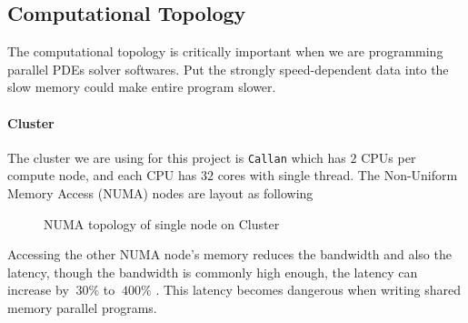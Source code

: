 \subsection{Computational Topology}
The computational topology is critically important when we are programming parallel PDEs solver softwares.
Put the strongly speed-dependent data into the slow memory could make entire program slower.

\paragraph{Cluster}
The cluster we are using for this project is \texttt{Callan} \cite{Callan_TCD} which has 
$2$ CPUs per compute node, and each CPU has $32$ cores with single thread. 
The Non-Uniform Memory Access (NUMA) nodes are layout as following 
\begin{figure}[htbp]
  \centering
  \caption{NUMA topology of single node on Cluster}
  \label{FIG_Topology_Callan}
\end{figure}
Accessing the other NUMA node's memory reduces the bandwidth and also the latency,
though the bandwidth is commonly high enough, the latency can increase by 
$~30\%$ to $~400\%$ \cite{NUMA_Latency_TCD}. 
This latency becomes dangerous when writing shared memory parallel programs.


